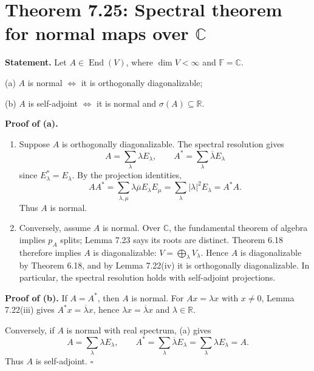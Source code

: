 \documentclass[11pt,a4paper]{article}
\newenvironment{proofsteps}{\begin{enumerate}\setlength{\itemsep}{4pt}}{\end{enumerate}}
\begin{document}
\section{Theorem 7.25: Spectral theorem for normal maps over \(\mathbb C\)}
\textbf{Statement.} Let \(A\in\operatorname{End}(V)\), where \(\dim V<\infty\) and \(\mathbb F=\mathbb C\).

(a) \(A\) is normal $\Longleftrightarrow$ it is orthogonally diagonalizable;

(b) \(A\) is self-adjoint $\Longleftrightarrow$ it is normal and \(\sigma(A)\subseteq\mathbb R\).

\textbf{Proof of (a).}
\begin{proofsteps}
\item Suppose \(A\) is orthogonally diagonalizable. The spectral resolution gives
\[
A=\sum_\lambda\lambda E_\lambda,\qquad
A^*=\sum_\lambda\overline\lambda E_\lambda
\]
since \(E_\lambda^*=E_\lambda\).
By the projection identities,
\[
AA^*=\sum_{\lambda,\mu}\lambda\overline\mu E_\lambda E_\mu
=\sum_\lambda|\lambda|^2E_\lambda=A^*A.
\]
Thus \(A\) is normal.
\item Conversely, assume \(A\) is normal. Over \(\mathbb C\), the fundamental theorem of algebra implies \(p_A\) splits; Lemma 7.23 says its roots are distinct. Theorem 6.18 therefore implies \(A\) is diagonalizable:
\(V=\bigoplus_\lambda V_\lambda\).
Hence \(A\) is diagonalizable by Theorem 6.18, and by Lemma 7.22(iv) it is orthogonally diagonalizable. In particular, the spectral resolution holds with self-adjoint projections.
\end{proofsteps}
\textbf{Proof of (b).}
If \(A=A^*\), then \(A\) is normal. For \(Ax=\lambda x\) with \(x\neq0\), Lemma 7.22(iii) gives \(A^*x=\overline\lambda x\), hence
\(\lambda x=\overline\lambda x\) and \(\lambda\in\mathbb R\).

Conversely, if \(A\) is normal with real spectrum, (a) gives
\[
A=\sum_\lambda\lambda E_\lambda,\qquad
A^*=\sum_\lambda\overline\lambda E_\lambda
=\sum_\lambda\lambda E_\lambda=A.
\]
Thus \(A\) is self-adjoint. \(\square\)
\end{document}
